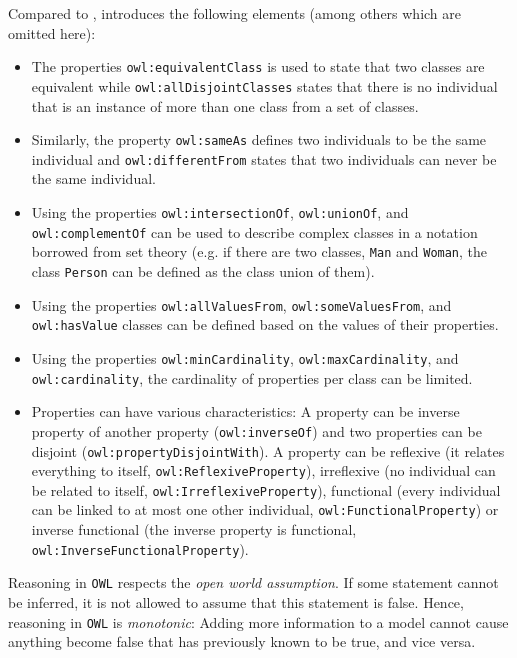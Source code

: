 Compared to ,  introduces the following elements (among others which are omitted here):


\begin{itemize}
  \item The properties \texttt{owl:equivalentClass} is used to state that two classes are equivalent while \texttt{owl:allDisjointClasses} states that there is no individual that is an instance of more than one class from a set of classes.
  \item Similarly, the property \texttt{owl:sameAs} defines two individuals to be the same individual and \texttt{owl:differentFrom} states that two individuals can never be the same individual.
  \item Using the properties \texttt{owl:intersectionOf}, \texttt{owl:unionOf}, and \texttt{owl:complementOf} can be used to describe complex classes in a notation borrowed from set theory (e.g. if there are two classes, \texttt{Man} and \texttt{Woman}, the class \texttt{Person} can be defined as the class union of them).
  \item Using the properties \texttt{owl:allValuesFrom}, \texttt{owl:someValuesFrom}, and \texttt{owl:hasValue} classes can be defined based on the values of their properties.
  \item Using the properties \texttt{owl:minCardinality}, \texttt{owl:maxCardinality}, and \texttt{owl:cardinality}, the cardinality of properties per class can be limited.
  \item Properties can have various characteristics: A property can be inverse property of another property (\texttt{owl:inverseOf}) and two properties can be disjoint (\texttt{owl:propertyDisjointWith}). A property can be reflexive (it relates everything to itself, \texttt{owl:ReflexiveProperty}), irreflexive (no individual can be related to itself, \texttt{owl:IrreflexiveProperty}), functional (every individual can be linked to at most one other individual, \texttt{owl:FunctionalProperty}) or inverse functional (the inverse property is functional, \texttt{owl:InverseFunctionalProperty}).
\end{itemize}

Reasoning in \texttt{OWL} respects the \emph{open world assumption}. If some statement cannot be inferred, it is not allowed to assume that this statement is false. Hence, reasoning in \texttt{OWL} is \emph{monotonic}: Adding more information to a model cannot cause anything become false that has previously known to be true, and vice versa.

